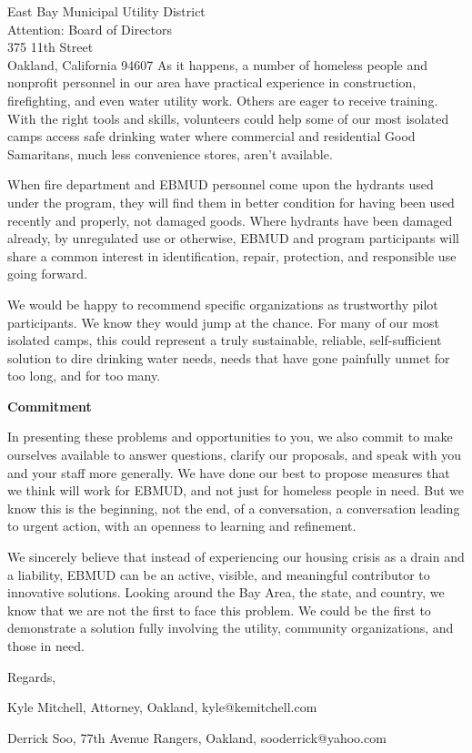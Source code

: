\documentclass[letterpaper]{letter}
\begin{document}
\begin{letter}{%
    East Bay Municipal Utility District\\
    Attention: Board of Directors\\
    375 11th Street\\
    Oakland, California 94607}
    As it happens, a number of homeless people and nonprofit personnel in our area have practical experience in construction, firefighting, and even water utility work. Others are eager to receive training. With the right tools and skills, volunteers could help some of our most isolated camps access safe drinking water where commercial and residential Good Samaritans, much less convenience stores, aren’t available.

    When fire department and EBMUD personnel come upon the hydrants used under the program, they will find them in better condition for having been used recently and properly, not damaged goods. Where hydrants have been damaged already, by unregulated use or otherwise, EBMUD and program participants will share a common interest in identification, repair, protection, and responsible use going forward.

    We would be happy to recommend specific organizations as trustworthy pilot participants. We know they would jump at the chance. For many of our most isolated camps, this could represent a truly sustainable, reliable, self-sufficient solution to dire drinking water needs, needs that have gone painfully unmet for too long, and for too many.

    \stopbreaks
    \textbf{Commitment}

    In presenting these problems and opportunities to you, we also commit to make ourselves available to answer questions, clarify our proposals, and speak with you and your staff more generally. We have done our best to propose measures that we think will work for EBMUD, and not just for homeless people in need. But we know this is the beginning, not the end, of a conversation, a conversation leading to urgent action, with an openness to learning and refinement.
    \startbreaks

    We sincerely believe that instead of experiencing our housing crisis as a drain and a liability, EBMUD can be an active, visible, and meaningful contributor to innovative solutions. Looking around the Bay Area, the state, and country, we know that we are not the first to face this problem. We could be the first to demonstrate a solution fully involving the utility, community organizations, and those in need.

    \begin{samepage}
    Regards,

    Kyle Mitchell, Attorney, Oakland, kyle@kemitchell.com

    Derrick Soo, 77th Avenue Rangers, Oakland, sooderrick@yahoo.com


\end{samepage}
\end{letter}
\end{document}
